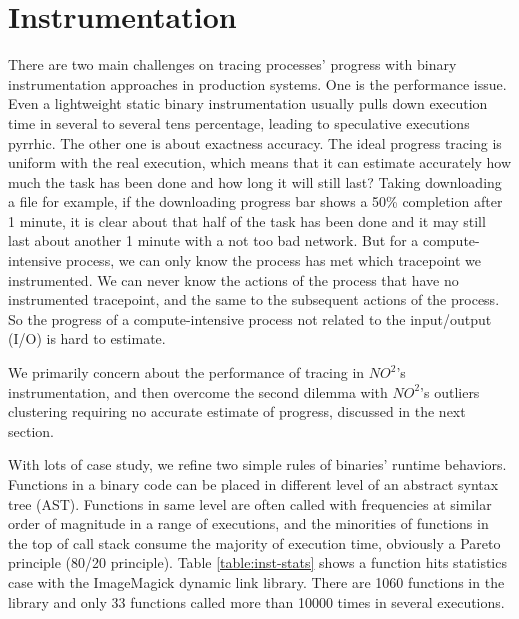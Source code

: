 \section{Instrumentation}

There are two main challenges on tracing processes' progress with binary instrumentation approaches in production systems. One is the performance issue. Even a lightweight static binary instrumentation usually pulls down execution time in several to several tens percentage, leading to speculative executions pyrrhic.  The other one is about exactness accuracy. The ideal progress tracing is uniform with the real execution, which means that it can estimate accurately how much the task has been done and how long it will still last? Taking downloading a file for example, if the downloading progress bar shows a 50\% completion after 1 minute, it is clear about that half of the task has been done and it may still last about another 1 minute with a not too bad network. But for a compute-intensive process, we can only know the process has met which tracepoint we instrumented. We can never know the actions of the process that have no instrumented tracepoint, and the same to the subsequent actions of the process. So the progress of a compute-intensive process not related to the input/output (I/O) is hard to estimate.

We primarily concern about the performance of tracing in $NO^2$'s instrumentation, and then overcome the second dilemma with $NO^2$'s outliers clustering requiring no accurate estimate of progress, discussed in the next section.

With lots of case study, we refine two simple rules of binaries' runtime behaviors. Functions in a binary code can be placed in different level of an abstract syntax tree (AST). Functions in same level are often called with frequencies at similar order of magnitude in a range of executions, and the minorities of functions in the top of call stack consume the majority of execution time, obviously a Pareto principle (80/20 principle). Table \ref{table:inst-stats} shows a function hits statistics case with the ImageMagick dynamic link library. There are 1060 functions in the library and only 33 functions called more than 10000 times in several executions.

